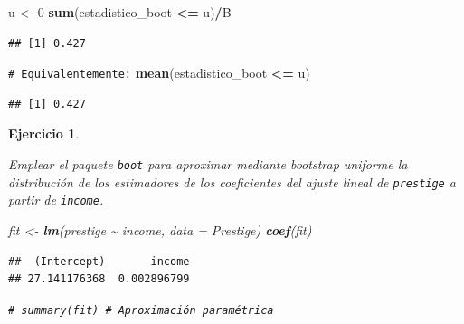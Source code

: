 \documentclass[
]{book}
\newenvironment{Shaded}{\begin{snugshade}}{\end{snugshade}}
\newcommand{\AttributeTok}[1]{\textcolor[rgb]{0.13,0.29,0.53}{#1}}
\newcommand{\CommentTok}[1]{\textcolor[rgb]{0.56,0.35,0.01}{\textit{#1}}}
\newcommand{\DecValTok}[1]{\textcolor[rgb]{0.00,0.00,0.81}{#1}}
\newcommand{\FunctionTok}[1]{\textcolor[rgb]{0.13,0.29,0.53}{\textbf{#1}}}
\newcommand{\NormalTok}[1]{#1}
\newcommand{\OtherTok}[1]{\textcolor[rgb]{0.56,0.35,0.01}{#1}}
\newcommand{\SpecialCharTok}[1]{\textcolor[rgb]{0.81,0.36,0.00}{\textbf{#1}}}
\theoremstyle{break}
\newtheorem{exercise}{Ejercicio}[chapter]
\theoremstyle{nonumberplain}
\renewcommand{\CommentTok}[1]{\textcolor[rgb]{0.41,0.41,0.41}{\texttt{#1}}}
\begin{document}
\begin{Shaded}
\begin{Highlighting}[]
\NormalTok{u }\OtherTok{\textless{}{-}} \DecValTok{0}
\FunctionTok{sum}\NormalTok{(estadistico\_boot }\SpecialCharTok{\textless{}=}\NormalTok{ u)}\SpecialCharTok{/}\NormalTok{B}
\end{Highlighting}
\end{Shaded}

\begin{verbatim}
## [1] 0.427
\end{verbatim}

\begin{Shaded}
\begin{Highlighting}[]
\CommentTok{\# Equivalentemente:}
\FunctionTok{mean}\NormalTok{(estadistico\_boot }\SpecialCharTok{\textless{}=}\NormalTok{ u)}
\end{Highlighting}
\end{Shaded}

\begin{verbatim}
## [1] 0.427
\end{verbatim}

\begin{exercise}
\protect\hypertarget{exr:boot-multi}{}\label{exr:boot-multi}

Emplear el paquete \texttt{boot} para aproximar mediante bootstrap uniforme
la distribución de los estimadores de los coeficientes del ajuste
lineal de \texttt{prestige} a partir de \texttt{income}.

\begin{Shaded}
\begin{Highlighting}[]
\NormalTok{fit }\OtherTok{\textless{}{-}} \FunctionTok{lm}\NormalTok{(prestige }\SpecialCharTok{\textasciitilde{}}\NormalTok{ income, }\AttributeTok{data =}\NormalTok{ Prestige)}
\FunctionTok{coef}\NormalTok{(fit)}
\end{Highlighting}
\end{Shaded}

\begin{verbatim}
##  (Intercept)       income 
## 27.141176368  0.002896799
\end{verbatim}

\begin{Shaded}
\begin{Highlighting}[]
\CommentTok{\# summary(fit) \# Aproximación paramétrica}
\end{Highlighting}
\end{Shaded}

\end{exercise}
\end{document}
